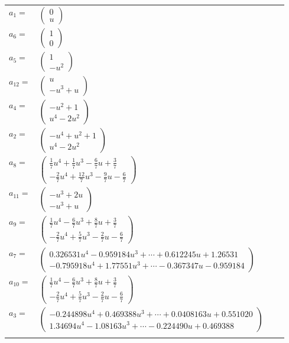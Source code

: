 \documentclass[1p]{elsarticle_modified}
\theoremstyle{definition}
\begin{document}
\begin{tabular}{m{7pt} m{180pt} m{7pt} m{180pt} }
\flushright $a_{1}=$&$\begin{pmatrix}0\\u\end{pmatrix}$ \\
\flushright $a_{6}=$&$\begin{pmatrix}1\\0\end{pmatrix}$ \\
\flushright $a_{5}=$&$\begin{pmatrix}1\\- u^2\end{pmatrix}$ \\
\flushright $a_{12}=$&$\begin{pmatrix}u\\- u^3+u\end{pmatrix}$ \\
\flushright $a_{4}=$&$\begin{pmatrix}- u^2+1\\u^4-2 u^2\end{pmatrix}$ \\
\flushright $a_{2}=$&$\begin{pmatrix}- u^4+u^2+1\\u^4-2 u^2\end{pmatrix}$ \\
\flushright $a_{8}=$&$\begin{pmatrix}\frac{1}{7} u^4+\frac{1}{7} u^3-\frac{6}{7} u+\frac{3}{7}\\-\frac{2}{7} u^4+\frac{12}{7} u^3-\frac{9}{7} u-\frac{6}{7}\end{pmatrix}$ \\
\flushright $a_{11}=$&$\begin{pmatrix}- u^3+2 u\\- u^3+u\end{pmatrix}$ \\
\flushright $a_{9}=$&$\begin{pmatrix}\frac{1}{7} u^4-\frac{6}{7} u^3+\frac{8}{7} u+\frac{3}{7}\\-\frac{2}{7} u^4+\frac{5}{7} u^3-\frac{2}{7} u-\frac{6}{7}\end{pmatrix}$ \\
\flushright $a_{7}=$&$\begin{pmatrix}0.326531 u^{4}-0.959184 u^{3}+\cdots+0.612245 u+1.26531\\-0.795918 u^{4}+1.77551 u^{3}+\cdots-0.367347 u-0.959184\end{pmatrix}$ \\
\flushright $a_{10}=$&$\begin{pmatrix}\frac{1}{7} u^4-\frac{6}{7} u^3+\frac{8}{7} u+\frac{3}{7}\\-\frac{2}{7} u^4+\frac{5}{7} u^3-\frac{2}{7} u-\frac{6}{7}\end{pmatrix}$ \\
\flushright $a_{3}=$&$\begin{pmatrix}-0.244898 u^{4}+0.469388 u^{3}+\cdots+0.0408163 u+0.551020\\1.34694 u^{4}-1.08163 u^{3}+\cdots-0.224490 u+0.469388\end{pmatrix}$\\&\end{tabular}
\end{document}
